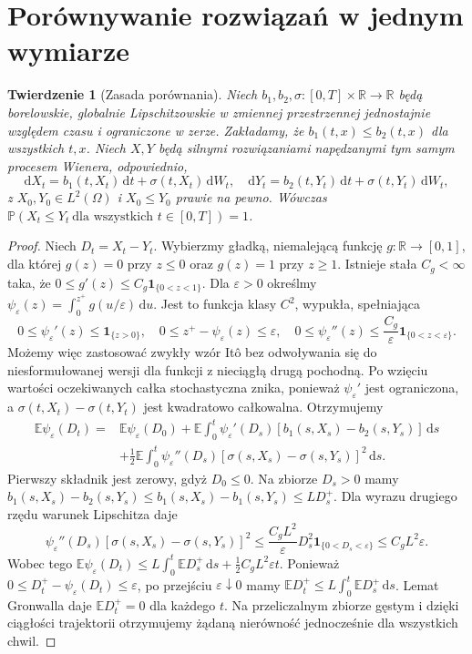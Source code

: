 \documentclass[11pt,a4paper,oneside]{report}
\numberwithin{equation}{chapter}
\theoremstyle{plain}
\newtheorem{twierdzenie}{Twierdzenie}[chapter]
\theoremstyle{definition}
\theoremstyle{remark}
\newcommand{\R}{\mathbb{R}}
\newcommand{\Prob}{\mathbb{P}}
\newcommand{\E}{\mathbb{E}}
\newcommand{\ind}[1]{\mathbf{1}_{#1}}
\newcommand{\dd}{\mathrm{d}}
\begin{document}
\section{Porównywanie rozwiązań w jednym wymiarze}
\begin{twierdzenie}[Zasada porównania]
\label{th:sde-comparison}
Niech $b_1,b_2,\sigma:[0,T]\times\R\to\R$
będą borelowskie, globalnie Lipschitzowskie w
zmiennej przestrzennej jednostajnie względem czasu
i ograniczone w zerze. Zakładamy, że
$b_1(t,x)\le b_2(t,x)$ dla wszystkich $t,x$.
Niech $X,Y$ będą silnymi rozwiązaniami napędzanymi
tym samym procesem Wienera, odpowiednio,
\[
\dd X_t=b_1(t,X_t)\,\dd t+\sigma(t,X_t)\,\dd W_t,
\quad
\dd Y_t=b_2(t,Y_t)\,\dd t+\sigma(t,Y_t)\,\dd W_t,
\]
z $X_0,Y_0\in L^2(\Omega)$ i $X_0\le Y_0$ prawie
na pewno. Wówczas
$\Prob(X_t\le Y_t\ \text{dla wszystkich }t\in[0,T])=1$.
\end{twierdzenie}
\begin{proof}
Niech $D_t=X_t-Y_t$. Wybierzmy gładką, niemalejącą
funkcję $g:\R\to[0,1]$, dla której $g(z)=0$
przy $z\le0$ oraz $g(z)=1$ przy $z\ge1$.
Istnieje stała $C_g<\infty$ taka, że
$0\le g'(z)\le C_g\ind{\{0<z<1\}}$.
Dla $\varepsilon>0$ określmy
$\psi_\varepsilon(z)=\int_0^{z^+}g(u/\varepsilon)\,\dd u$.
Jest to funkcja klasy $C^2$, wypukła, spełniająca
\[
0\le\psi_\varepsilon'(z)\le\ind{\{z>0\}},\quad
0\le z^+-\psi_\varepsilon(z)\le\varepsilon,\quad
0\le\psi_\varepsilon''(z)\le
\frac{C_g}{\varepsilon}\ind{\{0<z<\varepsilon\}}.
\]
Możemy więc zastosować zwykły wzór Itô bez
odwoływania się do niesformułowanej wersji dla
funkcji z nieciągłą drugą pochodną. Po wzięciu
wartości oczekiwanych
całka stochastyczna znika, ponieważ
$\psi_\varepsilon'$ jest ograniczona, a
$\sigma(t,X_t)-\sigma(t,Y_t)$ jest kwadratowo
całkowalna. Otrzymujemy
\[
\begin{split}
\E\psi_\varepsilon(D_t)
=&\E\psi_\varepsilon(D_0)
+\E\int_0^t\psi_\varepsilon'(D_s)
[b_1(s,X_s)-b_2(s,Y_s)]\,\dd s\\
&+\frac12\E\int_0^t\psi_\varepsilon''(D_s)
[\sigma(s,X_s)-\sigma(s,Y_s)]^2\,\dd s.
\end{split}
\]
Pierwszy składnik jest zerowy, gdyż $D_0\le0$.
Na zbiorze $D_s>0$ mamy
$b_1(s,X_s)-b_2(s,Y_s)
\le b_1(s,X_s)-b_1(s,Y_s)\le L D_s^+$.
Dla wyrazu drugiego rzędu warunek Lipschitza daje
\[
\psi_\varepsilon''(D_s)
[\sigma(s,X_s)-\sigma(s,Y_s)]^2
\le \frac{C_gL^2}{\varepsilon}D_s^2
\ind{\{0<D_s<\varepsilon\}}\le C_gL^2\varepsilon.
\]
Wobec tego
$\E\psi_\varepsilon(D_t)
\le L\int_0^t\E D_s^+\,\dd s+
\tfrac12 C_gL^2\varepsilon t$.
Ponieważ $0\le D_t^+-\psi_\varepsilon(D_t)\le\varepsilon$,
po przejściu $\varepsilon\downarrow0$ mamy
$\E D_t^+\le L\int_0^t\E D_s^+\,\dd s$.
Lemat Gronwalla daje $\E D_t^+=0$ dla każdego $t$.
Na przeliczalnym zbiorze gęstym i dzięki ciągłości
trajektorii otrzymujemy żądaną nierówność
jednocześnie dla wszystkich chwil.
\end{proof}
\end{document}
